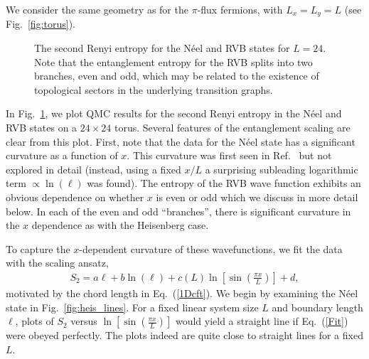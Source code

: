 \documentclass[prb,aps,twocolumn,floatfix,amsmath,amssymb,superscriptaddress,tightenlines]{revtex4}
\begin{document}
We consider the same geometry as for the $\pi$-flux fermions, with $L_x=L_y=L$ (see Fig.~\ref{fig:torus}).
 \begin{figure}
   \begin{center}
   \end{center}
   \caption{ The second Renyi entropy for the N\'eel and RVB states for $L=24$. Note that the entanglement entropy for the RVB splits into two branches, even and odd, which may be related to the existence of topological sectors in the underlying transition graphs.
   \label{fig:heis_bow} }
 \end{figure}
In Fig.~{\ref{fig:heis_bow}}, we plot QMC results for the second Renyi entropy in the N\'eel and RVB states on a $24 \times 24$ torus.  
Several features of the entanglement scaling are clear from this plot.  First, note that the data for the N\'eel state has a significant curvature as a function of $x$.  This curvature was first seen in Ref.~\cite{HeisLog} but not explored in detail (instead, using a fixed $x/L$ a surprising subleading logarithmic term $\propto \ln(\ell)$ was found).  
The entropy of the RVB wave function exhibits an obvious dependence on whether $x$ is even or odd which we discuss in more detail below. In each of the even and odd ``branches'', 
there is significant curvature in the $x$ dependence as with the Heisenberg case. 

To capture the $x$-dependent curvature of these wavefunctions, we fit the data with the scaling ansatz,
\begin{align}
S_2= a \ell + b\ln(\ell)
+ c(L) \ln \left[{ \sin\left({ \frac{\pi x}{L} }\right) }\right] + d, \label{Fit}
\end{align}
motivated by the chord length in Eq.~(\ref{1Dcft}).
We begin by examining the N\'eel state in Fig.~{\ref{fig:heis_lines}}.  For a fixed linear system size $L$ and boundary length $\ell$, plots of $S_2$ versus $ \ln \left[{ \sin\left({ \frac{\pi x}{L} }\right) }\right] $ would yield a straight line if Eq.~(\ref{Fit}) were obeyed perfectly.  The plots indeed are quite close to straight lines for a fixed $L$.
\end{document}
